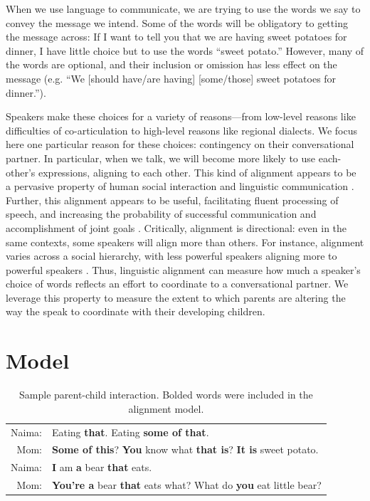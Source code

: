 \documentclass[10pt,letterpaper]{article}
\begin{document}
When we use language to communicate, we are trying to use the words we say to convey the message we intend. Some of the words will be obligatory to getting the message across: If I want to tell you that we are having sweet potatoes for dinner, I have little choice but to use the words ``sweet potato.'' However, many of the words are optional, and their inclusion or omission has less effect on the message (e.g. ``We [should have/are having] [some/those] sweet potatoes for dinner.''). 

Speakers make these choices for a variety of reasons---from low-level reasons like difficulties of co-articulation to high-level reasons like regional dialects. We focus here one particular reason for these choices: contingency on their conversational partner. In particular, when we talk, we will become more likely to use each-other's expressions, aligning to each other. This kind of alignment appears to be a pervasive property of human social interaction and linguistic communication \cite{giles1991}. 
Further, this alignment appears to be useful, facilitating fluent processing of speech, and increasing the probability of successful communication and accomplishment of joint goals \cite{ireland2011, fusaroli2012}. Critically, alignment is directional: even in the same contexts, some speakers will align more than others. For instance, alignment varies across a social hierarchy, with less powerful speakers aligning more to powerful speakers \cite{kacewicz2013}. Thus, linguistic alignment can measure how much a speaker's choice of words reflects an effort to coordinate to a conversational partner. We leverage this property to measure the extent to which parents are altering the way the speak to coordinate with their developing children.

\section{Model}

\begin{table}
\begin{tabular}{r p{}}
\hline
Naima: & Eating \textbf{that}. Eating \textbf{some of that}.\\

Mom: & \textbf{Some of this}? \textbf{You} know what \textbf{that is}? \textbf{It is} sweet potato.\\

Naima: & \textbf{I} am \textbf{a} bear \textbf{that} eats.\\

Mom: & \textbf{You're a} bear \textbf{that} eats what? What do \textbf{you} eat little bear?\\
\hline
\end{tabular}
\label{tab:naima}
\caption{Sample parent-child interaction. Bolded words were included in the alignment model.}
\end{table}
\end{document}
